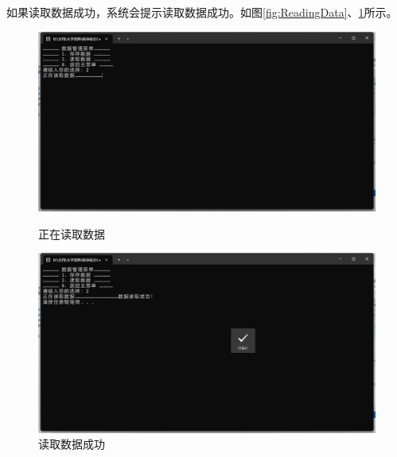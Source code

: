 \documentclass[12pt,twoside]{ctexart}
\begin{document}
如果读取数据成功，系统会提示读取数据成功。如图\ref{fig:ReadingData}、\ref{fig:ReadSuccessfully}所示。
\begin{figure}[H]
    \centering
    \begin{minipage}{0.48\textwidth}
        \centering
        \includegraphics[width=\linewidth]{ReadingData.png}
        \caption{正在读取数据}
        \label{fig:ReadingData}
    \end{minipage}\hfill
    \begin{minipage}{0.48\textwidth}
        \centering
        \includegraphics[width=\linewidth]{ReadSuccessfully.png}
        \caption{读取数据成功}
        \label{fig:ReadSuccessfully}
    \end{minipage}
\end{figure}
\end{document}
